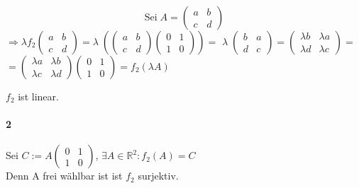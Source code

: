 \documentclass[10pt,a4paper]{article}
\begin{document}
$$ \text{Sei}\; A=\begin{pmatrix}a & b\\c&d\end{pmatrix} $$
$\Rightarrow \lambda f_2\begin{pmatrix}a & b\\c&d\end{pmatrix}=\lambda \; 
\left( \begin{pmatrix}a & b\\c&d\end{pmatrix}\begin{pmatrix}0 & 1\\1&0\end{pmatrix} \right)= $
$ \lambda \; \begin{pmatrix}b &a\\d&c\end{pmatrix} = 
\begin{pmatrix}\lambda b &\lambda a\\\lambda d&\lambda c\end{pmatrix}= $\\
$= \begin{pmatrix}\lambda a &\lambda b\\\lambda c&\lambda d\end{pmatrix}\begin{pmatrix}0 & 1\\1&0\end{pmatrix} = f_2(\lambda A) $  \begin{flushright} \checkmark \end{flushright}
$f_2$ ist linear.

\paragraph{2}
Sei $ C:=A\begin{pmatrix}0 & 1\\1&0\end{pmatrix} $, $ \exists A \in \mathbb{R}^2:f_2(A)=C $\\
Denn A frei wählbar ist ist $f_2$ surjektiv.
\end{document}
